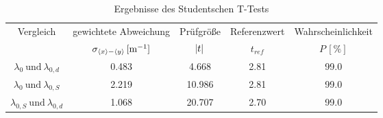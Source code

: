 \begin{table}[!h]
	\centering
	\begin{tabular}{|c|c|c|c|c|}
		\hline
		Vergleich & gewichtete Abweichung & Prüfgröße & Referenzwert & Wahrscheinlichkeit\\
		$ $ & $\sigma_{\langle x\rangle - \langle y\rangle}\,[\si{\per\meter}]$ & $\envert{t}$ & $t_{ref}$ & $P\,[\si{\percent}]$\\\hline\hline
		$\lambda_{0}\ \text{und}\ \lambda_{0,d}$  & \num{0.483}  & \num{4.668}  & \num{2.81}  & \num{99.0} \\
		$\lambda_{0}\ \text{und}\ \lambda_{0,S}$  & \num{2.219}  & \num{10.986}  & \num{2.81}  & \num{99.0} \\
		$\lambda_{0,S}\ \text{und}\ \lambda_{0,d}$  & \num{1.068}  & \num{20.707}  & \num{2.70}  & \num{99.0} \\
		\hline
	\end{tabular}
	\caption{Ergebnisse des Studentschen T-Tests \label{tab:Auswertung_StudentTest}}
\end{table}